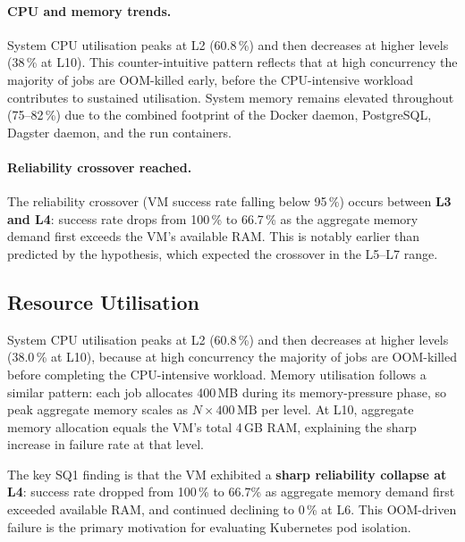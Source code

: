 \paragraph{CPU and memory trends.}
System CPU utilisation peaks at L2 (60.8\,\%) and then decreases at higher levels (38\,\% at L10).
This counter-intuitive pattern reflects that at high concurrency the majority of jobs are OOM-killed early, before the CPU-intensive workload contributes to sustained utilisation.
System memory remains elevated throughout (75--82\,\%) due to the combined footprint of the Docker daemon, PostgreSQL, Dagster daemon, and the run containers.

\paragraph{Reliability crossover reached.}
The reliability crossover (VM success rate falling below 95\,\%) occurs between \textbf{L3 and L4}: success rate drops from 100\,\% to 66.7\,\% as the aggregate memory demand first exceeds the VM's available RAM.
This is notably earlier than predicted by the hypothesis, which expected the crossover in the L5--L7 range.


\subsection{Resource Utilisation}
\label{subsec:exp1-resources}

System CPU utilisation peaks at L2 (60.8\,\%) and then decreases at higher levels (38.0\,\% at L10), because at high concurrency the majority of jobs are OOM-killed before completing the CPU-intensive workload.
Memory utilisation follows a similar pattern: each job allocates 400\,MB during its memory-pressure phase, so peak aggregate memory scales as $N \times 400\,\text{MB}$ per level.
At L10, aggregate memory allocation equals the VM's total 4\,GB RAM, explaining the sharp increase in failure rate at that level.

The key SQ1 finding is that the VM exhibited a \textbf{sharp reliability collapse at L4}: success rate dropped from 100\,\% to 66.7\% as aggregate memory demand first exceeded available RAM, and continued declining to 0\,\% at L6. This OOM-driven failure is the primary motivation for evaluating Kubernetes pod isolation.

